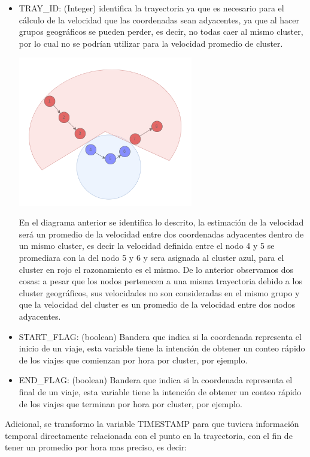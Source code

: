 \documentclass[a4paper]{article}
\begin{document}
\begin{itemize}
\item TRAY\_ID: (Integer) identifica la trayectoria ya que es necesario para el cálculo de la velocidad que las coordenadas sean adyacentes, ya que al hacer grupos geográficos se pueden perder, es decir, no todas caer al mismo cluster, por lo cual no se podrían utilizar para la velocidad promedio de cluster.

\begin{center}
\includegraphics[width=0.6\textwidth]{trayectoria.png}
\end{center}

En el diagrama anterior se identifica lo descrito, la estimaci\'on de la velocidad ser\'a un promedio de la velocidad entre dos coordenadas adyacentes dentro de un mismo cluster, es decir la velocidad definida entre el nodo 4 y 5 se promediara con la del nodo 5 y 6 y sera asignada al cluster azul, para el cluster en rojo el razonamiento es el mismo. De lo anterior observamos dos cosas: a pesar que los nodos pertenecen a una misma trayectoria debido a los cluster geogr\'aficos, sus velocidades no son consideradas en el mismo grupo y que la velocidad del cluster es un promedio de la velocidad entre dos nodos adyacentes.
\item START\_FLAG: (boolean) Bandera que indica si la coordenada representa el inicio de un viaje, esta variable tiene la intención de obtener un conteo rápido de los viajes que comienzan por hora por cluster, por ejemplo.
\item END\_FLAG: (boolean) Bandera que indica si la coordenada representa el final de un viaje, esta variable tiene la intención de obtener un conteo rápido de los viajes que terminan por hora por cluster, por ejemplo. 
\end{itemize}

\noindent
Adicional, se transformo la variable TIMESTAMP para que tuviera informaci\'on temporal directamente relacionada con el punto en la trayectoria, con el fin de tener un promedio por hora mas preciso, es decir: \\
\end{document}
